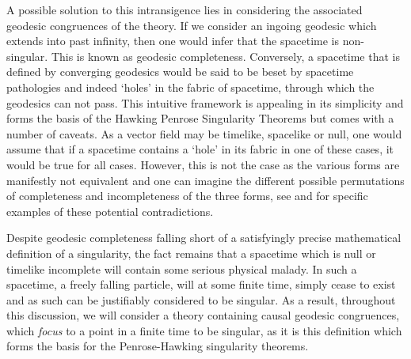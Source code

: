 A possible solution to this intransigence lies in considering the associated geodesic congruences of the theory. If we consider an ingoing geodesic which extends into past infinity, then one would infer that the spacetime is non-singular. This is known as geodesic completeness. Conversely, a spacetime that is defined by converging geodesics would be said to be beset by spacetime pathologies and indeed `holes' in the fabric of spacetime, through which the geodesics can not pass. This intuitive framework is appealing in its simplicity and forms the basis of the Hawking Penrose Singularity Theorems but   comes with a number of caveats. As a vector field may be timelike, spacelike or null, one would assume that if a spacetime contains a `hole' in its fabric in one of these cases, it would be true for all cases. However, this is not the case as the various forms are manifestly not equivalent and one can imagine the different possible permutations of completeness and incompleteness of the three forms, see  \cite{Geroch:1968ut} and \cite{Wald:GR} for specific examples of these potential contradictions.

Despite geodesic completeness falling short of a satisfyingly precise mathematical definition of a singularity, the fact remains that a spacetime which is null or timelike incomplete will contain some serious physical malady. In such a spacetime, a freely falling particle, will at some finite time, simply cease to exist and as such can be justifiably considered to be singular. As a result, throughout this discussion, we will consider a theory containing causal geodesic congruences, which \emph{focus} to a point in a finite time to be singular, as it is this definition which forms the basis for the Penrose-Hawking singularity theorems. 

